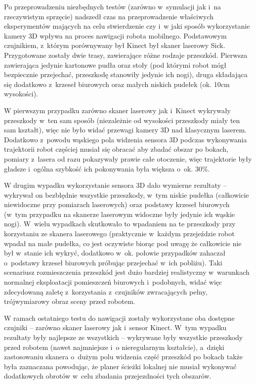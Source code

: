 Po przeprowadzeniu niezbędnych testów (zarówno w~symulacji jak i~na rzeczywistym
sprzęcie) nadszedł czas na przeprowadzenie właściwych eksperymentów mających
na celu stwierdzenie czy i~w jaki sposób wykorzystanie kamery 3D wpływa na
proces nawigacji robota mobilnego. Podstawowym czujnikiem, z~którym porównywany
był Kinect był skaner laserowy Sick. Przygotowane zostały dwie trasy, zawierające
różne rodzaje przeszkód. Pierwsza zawierająca jedynie kartonowe pudła oraz
stoły (pod którymi robot mógł bezpiecznie przejechać, przeszkodę stanowiły 
jedynie ich nogi), druga składająca się dodatkowo z~krzeseł biurowych oraz
małych niskich pudełek (ok. 10cm wysokości). 

W pierwszym przypadku zarówno skaner laserowy jak i~Kinect wykrywały przeszkody 
w~ten sam sposób (niezależnie od wysokości przeszkody miały ten sam kształt), 
więc nie było widać przewagi kamery 3D nad klasycznym laserem. Dodatkowo z~powodu
wąskiego pola widzenia sensora 3D podczas wykonywania trajektorii robot częściej
musiał się obracać aby zbadać obszar po bokach, pomiary z~lasera od razu
pokazywały prawie całe otoczenie, więc trajektorie były gładsze i~ogólna
szybkość ich pokonywania była większa o~ok. 30\%.

W drugim wypadku wykorzystanie sensora 3D dało wymierne rezultaty -- wykrywał
on bezbłędnie wszystkie przeszkody, w~tym niskie pudełka (całkowicie niewidoczne
przy pomiarach laserowych) oraz podstawy krzeseł biurowych (w~tym przypadku 
na skanerze laserowym widoczne były jedynie ich wąskie nogi). W~wielu wypadkach
skutkowało to wpadaniem na te przeszkody przy korzystaniu ze skanera laserowego
(praktycznie w~każdym przejeździe robot wpadał na małe pudełka, co jest 
oczywiste biorąc pod uwagę że całkowicie nie był w~stanie ich wykryć, dodatkowo
w~ok. połowie przypadków zahaczał o~podstawy krzeseł biurowych próbując 
przejechać w~ich pobliżu). Taki scenariusz rozmieszczenia przeszkód jest 
dużo bardziej realistyczny w~warunkach normalnej eksploatacji pomieszczeń 
biurowych i~podobnych, widać więc zdecydowaną zaletę z~korzystania z~czujników
zwracających pełny, trójwymiarowy obraz sceny przed robotem. 

W ramach ostatniego testu do nawigacji zostały wykorzystane oba dostępne czujniki 
-- zarówno skaner laserowy jak i~sensor Kinect. W~tym wypadku rezultaty były 
najlepsze ze wszystkich -- wykrywane były wszystkie przeszkody przed robotem
(nawet najmniejsze i~o nieregularnym kształcie), a~dzięki zastosowaniu skanera
o~dużym polu widzenia część przeszkód po bokach także była zaznaczana powodując,
że planer ścieżki lokalnej nie musiał wykonywać dodatkowych obrotów w~celu 
zbadania przejezdności tych obszarów.
